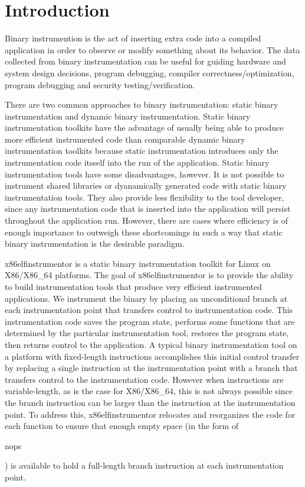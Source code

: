 \section{Introduction}

Binary instrumention is the act of inserting extra code into a compiled
application in order to observe or modify something about its behavior. The data
collected from binary instrumentation can be useful for guiding hardware and
system design decisions, program debugging, compiler correctness/optimization,
program debugging and security testing/verification.

There are two common approaches to binary instrumentation: static binary
instrumentation and dynamic binary instrumentation. Static binary
instrumentation toolkits have the advantage of usually being able to produce
more efficient instrumented code than comparable dynamic binary instrumentation toolkits
because static instrumentation introduces only the instrumentation code itsself into the run of the
application. Static binary instrumentation tools have some disadvantages,
however. It is not possible to instrument shared libraries or dyanamically
generated code with static binary instrumentation tools. They also provide less
flexibility to the tool developer, since any instrumentation code that is
inserted into the application will persist throughout the application run.
However, there are cases where efficiency is of enough importance to outweigh
these shortcomings in such a way that static binary instrumentation is the
desirable paradigm.

x86elfinstrumentor is a static binary instrumentation toolkit for Linux on
X86/X86\_64 platforms. The goal of x86elfinstrumentor is to provide the ability
to build instrumentation tools that produce very efficient instrumented
applications. We instrument the binary by placing an unconditional branch at each instrumentation
point that transfers control to instrumentation code. This instrumentation code saves the
program state, performs some functions that are determined by the particular instrumentation tool,
restores the program state, then returns control to the application.
A typical binary instrumentation tool on a platform with fixed-length instructions 
\cite{tikir2006pmac} accomplishes this initial control transfer by replacing a
single instruction at the instrumentation point with a branch that transfers
control to the instrumentation code. However when instructions are variable-length, as
is the case for X86/X86\_64, this is not always possible since the branch instruction can be larger than the
instruction at the instrumentation point. To address this, x86elfinstrumentor
relocates and reorganizes the code for each function to ensure that enough empty
space (in the form of \begin{it}nops\end{it}) is available to hold a full-length branch instruction at each
instrumentation point.

